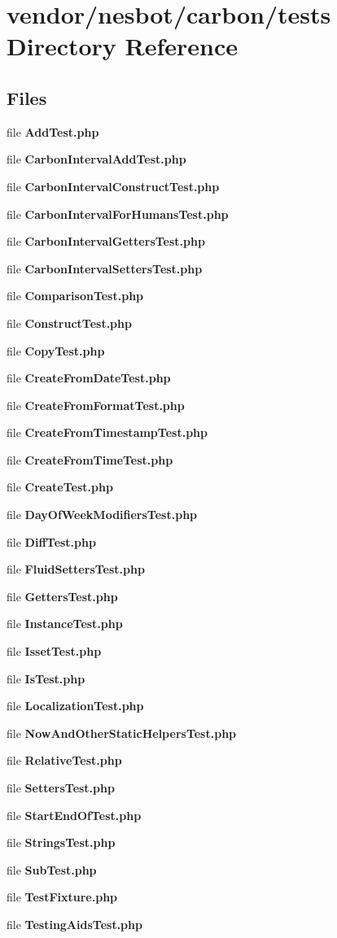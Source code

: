 \section{vendor/nesbot/carbon/tests Directory Reference}
\label{dir_f856238f62bf25acb9b8d800cce53b35}
\subsection*{Files}
\begin{DoxyCompactItemize}
\item 
file {\bf Add\+Test.\+php}
\item 
file {\bf Carbon\+Interval\+Add\+Test.\+php}
\item 
file {\bf Carbon\+Interval\+Construct\+Test.\+php}
\item 
file {\bf Carbon\+Interval\+For\+Humans\+Test.\+php}
\item 
file {\bf Carbon\+Interval\+Getters\+Test.\+php}
\item 
file {\bf Carbon\+Interval\+Setters\+Test.\+php}
\item 
file {\bf Comparison\+Test.\+php}
\item 
file {\bf Construct\+Test.\+php}
\item 
file {\bf Copy\+Test.\+php}
\item 
file {\bf Create\+From\+Date\+Test.\+php}
\item 
file {\bf Create\+From\+Format\+Test.\+php}
\item 
file {\bf Create\+From\+Timestamp\+Test.\+php}
\item 
file {\bf Create\+From\+Time\+Test.\+php}
\item 
file {\bf Create\+Test.\+php}
\item 
file {\bf Day\+Of\+Week\+Modifiers\+Test.\+php}
\item 
file {\bf Diff\+Test.\+php}
\item 
file {\bf Fluid\+Setters\+Test.\+php}
\item 
file {\bf Getters\+Test.\+php}
\item 
file {\bf Instance\+Test.\+php}
\item 
file {\bf Isset\+Test.\+php}
\item 
file {\bf Is\+Test.\+php}
\item 
file {\bf Localization\+Test.\+php}
\item 
file {\bf Now\+And\+Other\+Static\+Helpers\+Test.\+php}
\item 
file {\bf Relative\+Test.\+php}
\item 
file {\bf Setters\+Test.\+php}
\item 
file {\bf Start\+End\+Of\+Test.\+php}
\item 
file {\bf Strings\+Test.\+php}
\item 
file {\bf Sub\+Test.\+php}
\item 
file {\bf Test\+Fixture.\+php}
\item 
file {\bf Testing\+Aids\+Test.\+php}
\end{DoxyCompactItemize}
